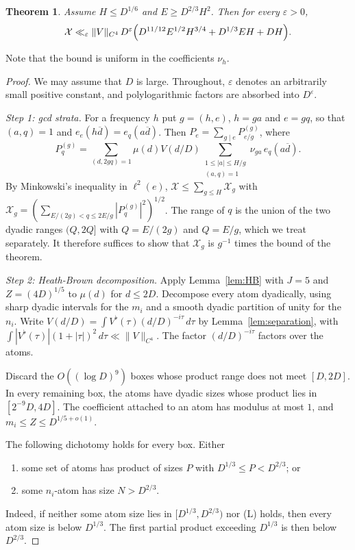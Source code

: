 \documentclass[11pt]{amsart}
\newtheorem{theorem}{Theorem}[section]
\theoremstyle{definition}
\theoremstyle{remark}
\numberwithin{equation}{section}
\newcommand{\cX}{\mathcal X}
\newcommand{\eps}{\varepsilon}
\newcommand{\inv}[1]{\overline{#1}}
\begin{document}
\begin{theorem}\label{thm:meanvalue}
Assume $H\le D^{1/6}$ and $E\ge D^{2/3}H^2$.  Then for every $\eps>0$,
\[
 \cX\ll_\eps\|V\|_{C^4}\,D^{\eps}
 \Bigl(D^{11/12}E^{1/2}H^{3/4}+D^{1/3}EH+DH\Bigr).
\]
\end{theorem}

Note that the bound is uniform in the coefficients $\nu_h$.

\begin{proof}
We may assume that $D$ is large.  Throughout, $\eps$ denotes an arbitrarily
small positive constant, and polylogarithmic factors are absorbed into
$D^{\eps}$.

\emph{Step 1: gcd strata.}  For a frequency $h$ put $g=(h,e)$, $h=ga$ and
$e=gq$, so that $(a,q)=1$ and $e_e(h\inv d)=e_q(a\inv d)$.  Then
$P_e=\sum_{g\mid e}P^{(g)}_{e/g}$, where
\[
 P^{(g)}_q=\sum_{(d,2gq)=1}\mu(d)V(d/D)
 \sum_{\substack{1\le|a|\le H/g\\(a,q)=1}}\nu_{ga}\,e_q(a\inv d).
\]
By Minkowski's inequality in $\ell^2(e)$,
$\cX\le\sum_{g\le H}\cX_g$ with
$\cX_g=(\sum_{E/(2g)<q\le2E/g}|P^{(g)}_q|^2)^{1/2}$.  The range of $q$ is
the union of the two dyadic ranges $(Q,2Q]$ with $Q=E/(2g)$ and $Q=E/g$,
which we treat separately.  It therefore suffices to show that $\cX_g$ is
$g^{-1}$ times the bound of the theorem.

\emph{Step 2: Heath-Brown decomposition.}  Apply Lemma~\ref{lem:HB} with
$J=5$ and $Z=(4D)^{1/5}$ to $\mu(d)$ for $d\le2D$.  Decompose every atom
dyadically, using sharp dyadic intervals for the $m_i$ and a smooth dyadic
partition of unity for the $n_i$.  Write
$V(d/D)=\int V^\flat(\tau)(d/D)^{-i\tau}\,d\tau$ by
Lemma~\ref{lem:separation}, with $\int|V^\flat(\tau)|(1+|\tau|)^2\,d\tau\ll
\|V\|_{C^4}$.  The factor $(d/D)^{-i\tau}$ factors over the atoms.

Discard the $O((\log D)^9)$ boxes whose product range does not meet $[D,2D]$.
In every remaining box, the atoms have dyadic sizes whose product lies in
$[2^{-9}D,4D]$.  The coefficient attached to an atom has modulus at most
$1$, and $m_i\le Z\le D^{1/5+o(1)}$.

The following dichotomy holds for every box.  Either
\begin{enumerate}
\item[(B)] some set of atoms has product of sizes $P$ with
$D^{1/3}\le P<D^{2/3}$; or
\item[(L)] some $n_i$-atom has size $N>D^{2/3}$.
\end{enumerate}
Indeed, if neither some atom size lies in $[D^{1/3},D^{2/3})$ nor (L)
holds, then every atom size is below $D^{1/3}$.  The first partial product
exceeding $D^{1/3}$ is then below $D^{2/3}$.


\end{proof}
\end{document}
